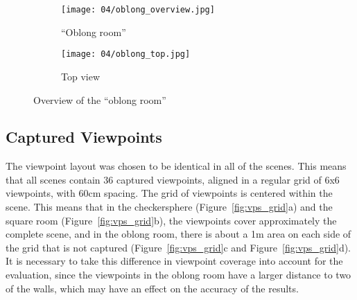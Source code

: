 \begin{figure}
\centering
    \hfill
    \begin{subfigure}[b]{0.5\textwidth}
            \centering
            \texttt{[image: 04/oblong\_overview.jpg]}
            \caption{``Oblong room''}
    \end{subfigure}%
    \hfill
    \begin{subfigure}[b]{0.5\textwidth}
            \centering
            \texttt{[image: 04/oblong\_top.jpg]}
            \caption{Top view}
    \end{subfigure}
    \hfill
%
  \caption{Overview of the ``oblong room''}
  \label{fig:oblong_room}
\end{figure}

\subsection{Captured Viewpoints}
The viewpoint layout was chosen to be identical in all of the scenes. This means that all scenes contain 36 captured viewpoints, aligned in a regular grid of 6x6 viewpoints, with 60cm spacing. The grid of viewpoints is centered within the scene. This means that in the checkersphere (Figure~\ref{fig:vps_grid}a) and the square room (Figure~\ref{fig:vps_grid}b), the viewpoints cover approximately the complete scene, and in the oblong room, there is about a 1m area on each side of the grid that is not captured (Figure~\ref{fig:vps_grid}c and Figure~\ref{fig:vps_grid}d). It is necessary to take this difference in viewpoint coverage into account for the evaluation, since the viewpoints in the oblong room have a larger distance to two of the walls, which may have an effect on the accuracy of the results.

